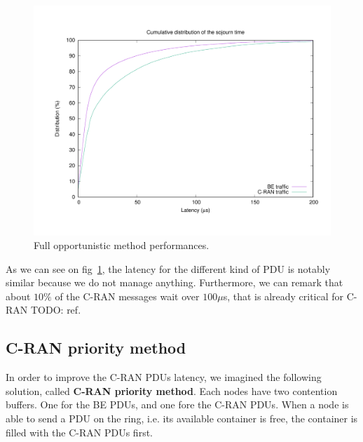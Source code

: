 \documentclass[]{algotel}
\newcommand{\todo}[1]{{\color{red} TODO: {#1}}}
\begin{document}
    \begin{figure}[h!]
    \label{fig:oport}
        \begin{center}
      \includegraphics[scale=0.4]{oport}

      \caption{Full opportunistic method performances.}
      \end{center}
  \end{figure}
  
  As we can see on fig~\ref{fig:oport}, the latency for the different kind of PDU is notably similar because we do not manage anything. Furthermore, we can remark that about $10\%$ of the C-RAN messages wait over $100\mu$s, that is already critical for C-RAN \todo{ref}.

\subsection{C-RAN priority method}
\label{sec:cranprio}
  In order to improve the C-RAN PDUs latency, we imagined the following solution, called {\bf C-RAN priority method}. Each nodes have two contention buffers. One for the BE PDUs, and one fore the C-RAN PDUs. When a node is able to send a PDU on the ring, i.e. its available container is free, the container is filled with the C-RAN PDUs first. 
  
\end{document}
